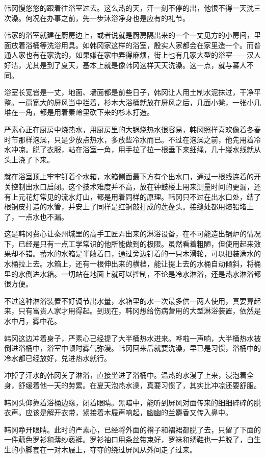 韩冈慢悠悠的跟着往浴室过去。这么热的天，汗一刻不停的出，他恨不得一天洗三次澡。何况在办事之前，先一步沐浴净身也是应有的礼节。

韩家的浴室就建在厨房边上，或者说就是厨房隔出来的一个一丈见方的小房间，里面放着浴桶等洗浴用具。如韩冈家这样的浴室，殷实人家都会在家里造一个。而普通人家也有在家洗的，如果嫌在家中弄得麻烦，街上也有几家大型的浴室——汉人好洁，尤其是到了夏天，基本上就是像韩冈这样天天洗澡。这一点，就与蕃人不同。

浴室长宽皆是一丈，地面、墙面都是前些日子，韩冈让人用土制水泥抹过，干净平整。一扇宽大的屏风当中拦着，杉木大浴桶就放在屏风之后，几面小凳，一张小几堆在一角，都是用着秦岭里砍下来的杉木打造。

严素心正在厨房中烧热水，用厨房里的大锅烧热水很容易，韩冈照样喜欢像着冬春时节那样泡澡，只是少放点热水，多放些冷水而已。不过在泡澡之前，他先用着冷水冲凉。脱了衣服，站在浴室一角，用手拉了拉一根垂下来细绳，几十缕水线就从头上浇了下来。

就在浴室顶上牢牢钉着个水箱，水箱侧面最下方有个出水口，通过一根线连着的开关控制出水口启闭。这个技术难度并不高，放在钟鼓楼上用来测量时间的更漏，还有上元花灯常见的流水灯山，都是用着同样的原理。韩冈只不过在出水口处，结了根铜皮打造的水管，并安上了同样是红铜敲打成的莲蓬头。接缝处都用熔铅堵上了，一点水也不漏。

这是韩冈费心让秦州城里的高手工匠弄出来的淋浴设备，在不可能造出锅炉的情况下，已经是只有一点工学常识的他所能做到的极限。虽然看着粗陋，但使用起来效果却不错。蓄水的水箱是半敞着口，通过旁边钉着的一只木滑轮，可以把装满水的水桶拉上去。水箱上，还有一根伸出来的横档，能让提上去的水桶自动倾斜，将桶里的水倒进水箱。一切站在地面上就可以控制，不论是冷水淋浴，还是热水淋浴都很方便。

不过这种淋浴装置不好调节出水量，水箱里的水一次最多供一两人使用，真要算起来，只有富贵人家才用得起。到现在，韩冈想给伤病营用的大型淋浴装置，依然是水中月，雾中花。

韩冈这边冲着身子，严素心已经提了大半桶热水进来。哗啦一声响，大半桶热水被倒进浴桶中，浴室中顿时雾气弥漫。韩冈回来后就要洗澡，早已是习惯，浴桶中的冷水都已经放好，兑进热水就行。

冲掉了汗水的韩冈关了淋浴，直接坐进了浴桶中。温热的水漫了上来，浸泡着全身，舒缓着他一天的劳累。在夏天泡热水澡，真要习惯了，其实比冲凉还要舒服。

韩冈头仰靠着浴桶边缘，闭着眼睛。黑暗中，能听到屏风对面传来的细细碎碎的脱衣声。应该是解开衣带，紧接着木屐声响起，幽幽的兰麝香又传入鼻中。

韩冈睁开眼睛。此时的严素心，已经将外面的褙子和褶裙都脱了去，只留了下面的一件藕色罗衫和薄纱亵裤。罗衫袖口用条丝带束好，罗袜和绣鞋也一并脱了，白生生的小脚套在一对木屐上，夺夺的绕过屏风从外间走了过来。

